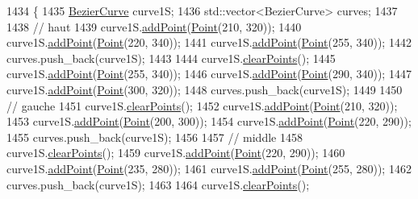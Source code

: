\begin{DoxyCode}
1434                \{
1435     \mbox{\hyperlink{class_bezier_curve}{BezierCurve}} curve1S;
1436     std::vector<BezierCurve> curves;
1437 
1438     \textcolor{comment}{// haut}
1439     curve1S.\mbox{\hyperlink{class_bezier_curve_a38d16c18b36ae45619b05e26e226cf34}{addPoint}}(\mbox{\hyperlink{class_point}{Point}}(210, 320));
1440     curve1S.\mbox{\hyperlink{class_bezier_curve_a38d16c18b36ae45619b05e26e226cf34}{addPoint}}(\mbox{\hyperlink{class_point}{Point}}(220, 340));
1441     curve1S.\mbox{\hyperlink{class_bezier_curve_a38d16c18b36ae45619b05e26e226cf34}{addPoint}}(\mbox{\hyperlink{class_point}{Point}}(255, 340));
1442     curves.push\_back(curve1S);
1443 
1444     curve1S.\mbox{\hyperlink{class_bezier_curve_a0ba8ce66d5af5971ae6a1b506029728e}{clearPoints}}();
1445     curve1S.\mbox{\hyperlink{class_bezier_curve_a38d16c18b36ae45619b05e26e226cf34}{addPoint}}(\mbox{\hyperlink{class_point}{Point}}(255, 340));
1446     curve1S.\mbox{\hyperlink{class_bezier_curve_a38d16c18b36ae45619b05e26e226cf34}{addPoint}}(\mbox{\hyperlink{class_point}{Point}}(290, 340));
1447     curve1S.\mbox{\hyperlink{class_bezier_curve_a38d16c18b36ae45619b05e26e226cf34}{addPoint}}(\mbox{\hyperlink{class_point}{Point}}(300, 320));
1448     curves.push\_back(curve1S);
1449 
1450     \textcolor{comment}{// gauche}
1451     curve1S.\mbox{\hyperlink{class_bezier_curve_a0ba8ce66d5af5971ae6a1b506029728e}{clearPoints}}();
1452     curve1S.\mbox{\hyperlink{class_bezier_curve_a38d16c18b36ae45619b05e26e226cf34}{addPoint}}(\mbox{\hyperlink{class_point}{Point}}(210, 320));
1453     curve1S.\mbox{\hyperlink{class_bezier_curve_a38d16c18b36ae45619b05e26e226cf34}{addPoint}}(\mbox{\hyperlink{class_point}{Point}}(200, 300));
1454     curve1S.\mbox{\hyperlink{class_bezier_curve_a38d16c18b36ae45619b05e26e226cf34}{addPoint}}(\mbox{\hyperlink{class_point}{Point}}(220, 290));
1455     curves.push\_back(curve1S);
1456 
1457     \textcolor{comment}{// middle}
1458     curve1S.\mbox{\hyperlink{class_bezier_curve_a0ba8ce66d5af5971ae6a1b506029728e}{clearPoints}}();
1459     curve1S.\mbox{\hyperlink{class_bezier_curve_a38d16c18b36ae45619b05e26e226cf34}{addPoint}}(\mbox{\hyperlink{class_point}{Point}}(220, 290));
1460     curve1S.\mbox{\hyperlink{class_bezier_curve_a38d16c18b36ae45619b05e26e226cf34}{addPoint}}(\mbox{\hyperlink{class_point}{Point}}(235, 280));
1461     curve1S.\mbox{\hyperlink{class_bezier_curve_a38d16c18b36ae45619b05e26e226cf34}{addPoint}}(\mbox{\hyperlink{class_point}{Point}}(255, 280));
1462     curves.push\_back(curve1S);
1463 
1464     curve1S.\mbox{\hyperlink{class_bezier_curve_a0ba8ce66d5af5971ae6a1b506029728e}{clearPoints}}();

\end{DoxyCode}
